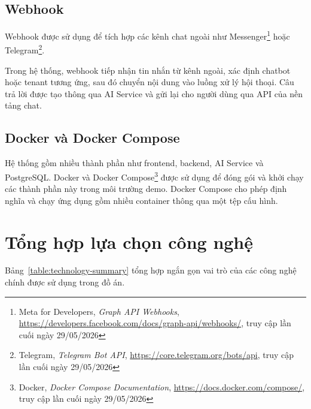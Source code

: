 \documentclass[../DoAn.tex]{subfiles}
\begin{document}
\subsection{Webhook}
\label{subsection:3.2.7}

Webhook được sử dụng để tích hợp các kênh chat ngoài như Messenger\footnote{Meta for Developers, \textit{Graph API Webhooks}, \url{https://developers.facebook.com/docs/graph-api/webhooks/}, truy cập lần cuối ngày 29/05/2026} hoặc Telegram\footnote{Telegram, \textit{Telegram Bot API}, \url{https://core.telegram.org/bots/api}, truy cập lần cuối ngày 29/05/2026}.

Trong hệ thống, webhook tiếp nhận tin nhắn từ kênh ngoài, xác định chatbot hoặc tenant tương ứng, sau đó chuyển nội dung vào luồng xử lý hội thoại. Câu trả lời được tạo thông qua AI Service và gửi lại cho người dùng qua API của nền tảng chat.

\subsection{Docker và Docker Compose}
\label{subsection:3.2.8}

Hệ thống gồm nhiều thành phần như frontend, backend, AI Service và PostgreSQL. Docker và Docker Compose\footnote{Docker, \textit{Docker Compose Documentation}, \url{https://docs.docker.com/compose/}, truy cập lần cuối ngày 29/05/2026} được sử dụng để đóng gói và khởi chạy các thành phần này trong môi trường demo. Docker Compose cho phép định nghĩa và chạy ứng dụng gồm nhiều container thông qua một tệp cấu hình.

\section{Tổng hợp lựa chọn công nghệ}
\label{section:3.3}

Bảng~\ref{table:technology-summary} tổng hợp ngắn gọn vai trò của các công nghệ chính được sử dụng trong đồ án.
\end{document}
